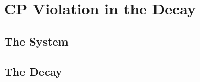 \section{CP Violation in the \texorpdfstring{\BstoJpsiphi{}}{Bs0->Jpsiphi} Decay}
\label{sec:intro_Jpsiphi}

\subsection{The \texorpdfstring{\BsBsbar{}}{Bs0-Bs0bar} System}
\label{subsec:intro_Jpsiphi_Bs}



\subsection{The \texorpdfstring{\BstoJpsiphi{}}{Bs0->Jpsiphi} Decay}
\label{subsec:intro_Jpsiphi_decay}
